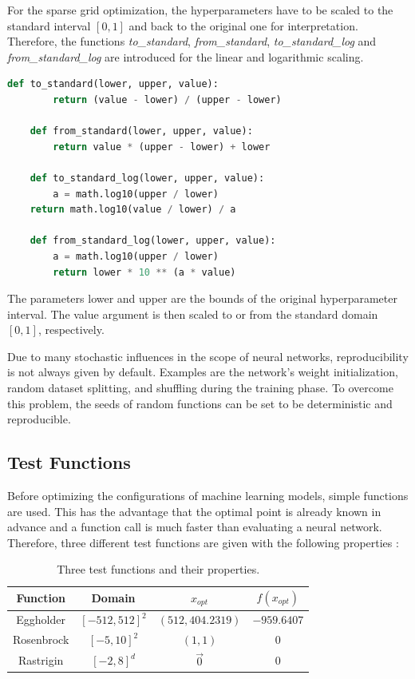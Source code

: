 For the sparse grid optimization, the hyperparameters have to be scaled to the standard interval $ [0,1] $ and back to the original one for interpretation. Therefore, the functions \textit{to\_standard}, \textit{from\_standard}, \textit{to\_standard\_log} and \textit{from\_standard\_log} are introduced for the linear and logarithmic scaling. 

\begin{lstlisting}[language=Python]
	def to_standard(lower, upper, value):
		return (value - lower) / (upper - lower)
	
	def from_standard(lower, upper, value):
		return value * (upper - lower) + lower
	
	def to_standard_log(lower, upper, value):
		a = math.log10(upper / lower)
	return math.log10(value / lower) / a	
	
	def from_standard_log(lower, upper, value):
		a = math.log10(upper / lower)
		return lower * 10 ** (a * value)
\end{lstlisting}

The parameters lower and upper are the bounds of the original hyperparameter interval. The value argument is then scaled to or from the standard domain $ [0,1] $, respectively. \newline 

Due to many stochastic influences in the scope of neural networks, reproducibility is not always given by default. Examples are the network's weight initialization, random dataset splitting, and shuffling during the training phase. To overcome this problem, the seeds of random functions can be set to be deterministic and reproducible.


\subsection{Test Functions}

Before optimizing the configurations of machine learning models, simple functions are used. This has the advantage that the optimal point is already known in advance and a function call is much faster than evaluating a neural network. Therefore, three different test functions are given with the following properties \cite{valentin2016hierarchical}:

\begin{table}[H]
	\caption{ Three test functions and their properties.}
	\label{tab:test_functions}
	\centering
	\begin{tabular}{|c c c c|} 
		\hline
		Function & Domain & $x_{opt}$ & $ f(x_{opt}) $\\
		\hline
		Eggholder & $[-512, 512]^2 $ & $(512, 404.2319)$ & $ -959.6407 $ \\
		Rosenbrock & $[-5, 10]^2 $ & $(1,1)$ & $ 0 $ \\
		Rastrigin & $[-2, 8]^d $ & $\vec{0}$ & $ 0 $ \\
		\hline
	\end{tabular}
\end{table}

